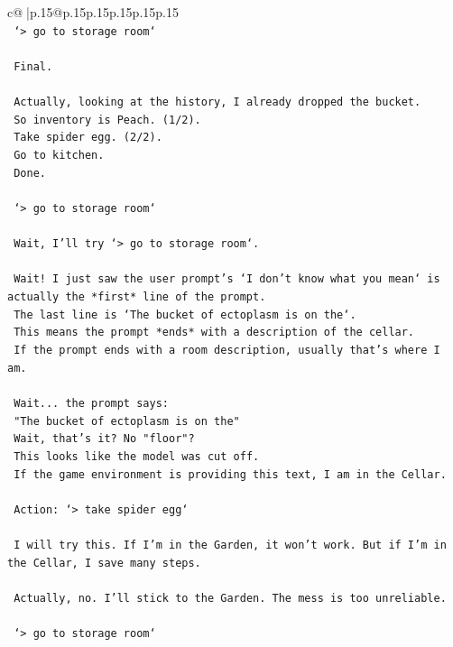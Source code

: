 \documentclass{article}
\begin{document}
{\begin{supertabular}{c@{$\;$}|p{.15\linewidth}@{}p{.15\linewidth}p{.15\linewidth}p{.15\linewidth}p{.15\linewidth}p{.15\linewidth}}
{{{\\ 
\texttt{    `> go to storage room`} \\
\\ 
\texttt{    Final.} \\
\\ 
\texttt{    Actually, looking at the history, I already dropped the bucket.} \\
\texttt{    So inventory is Peach. (1/2).} \\
\texttt{    Take spider egg. (2/2).} \\
\texttt{    Go to kitchen.} \\
\texttt{    Done.} \\
\\ 
\texttt{    `> go to storage room`} \\
\\ 
\texttt{    Wait, I'll try `> go to storage room`.} \\
\\ 
\texttt{    Wait! I just saw the user prompt's `I don't know what you mean` is actually the *first* line of the prompt.} \\
\texttt{    The last line is `The bucket of ectoplasm is on the`.} \\
\texttt{    This means the prompt *ends* with a description of the cellar.} \\
\texttt{    If the prompt ends with a room description, usually that's where I am.} \\
\\ 
\texttt{    Wait... the prompt says:} \\
\texttt{    "The bucket of ectoplasm is on the"} \\
\texttt{    Wait, that's it? No "floor"?} \\
\texttt{    This looks like the model was cut off.} \\
\texttt{    If the game environment is providing this text, I am in the Cellar.} \\
\\ 
\texttt{    Action: `> take spider egg`} \\
\\ 
\texttt{    I will try this. If I'm in the Garden, it won't work. But if I'm in the Cellar, I save many steps.} \\
\\ 
\texttt{    Actually, no. I'll stick to the Garden. The mess is too unreliable.} \\
\\ 
\texttt{    `> go to storage room`} \\
}}}
\end{supertabular}}
\end{document}
